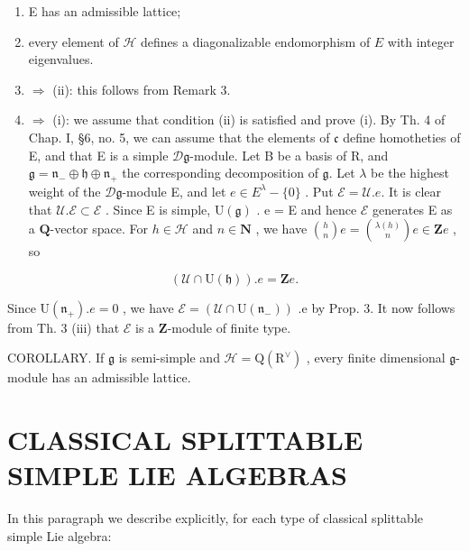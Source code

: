 \begin{enumerate}
\def\labelenumi{(\roman{enumi})}
\item
  E has an admissible lattice;
\item
  every element of \(\mathcal{H}\) defines a diagonalizable endomorphism of \(E\) with integer eigenvalues.
\item
  \(\Longrightarrow\) (ii): this follows from Remark 3.
\item
  \(\Longrightarrow\) (i): we assume that condition (ii) is satisfied and prove (i). By Th. 4 of Chap. I, §6, no. 5, we can assume that the elements of \(\mathfrak{c}\) define homotheties of E, and that E is a simple \(\mathcal{D}\mathfrak{g}\)-module. Let B be a basis of \(\mathrm{R}\), and \(\mathfrak{g} = \mathfrak{n}_{-} \oplus \mathfrak{h} \oplus \mathfrak{n}_{+}\) the corresponding decomposition of \(\mathfrak{g}\). Let \(\lambda\) be the highest weight of the \(\mathcal{D}\mathfrak{g}\)-module E, and let \(e \in E^{\lambda} - \{0\}\) . Put \(\mathcal{E} = \mathcal{U}.e\). It is clear that \(\mathcal{U}.\mathcal{E} \subset \mathcal{E}\) . Since E is simple, \(\mathrm{U}(\mathfrak{g})\) . e = E and hence \(\mathcal{E}\) generates E as a \(\mathbf{Q}\)-vector space. For \(h \in \mathcal{H}\) and \(n \in \mathbf{N}\) , we have \(\binom{h}{n} e = \binom{\lambda(h)}{n} e \in \mathbf{Z} e\) , so
\end{enumerate}

\[
(\mathcal {U} \cap \mathrm{U} (\mathfrak {h})). e = \mathbf {Z}   e.
\]

Since \(\mathrm{U}(\mathfrak{n}_{+}).e=0\) , we have \(\mathcal{E}=(\mathcal{U}\cap\mathrm{U}(\mathfrak{n}_{-}))\) .e by Prop. 3. It now follows from Th. 3 (iii) that \(\mathcal{E}\) is a \(\mathbf{Z}\)-module of finite type.

COROLLARY. If \(\mathfrak{g}\) is semi-simple and \(\mathcal{H}=\mathrm{Q}(\mathrm{R}^{\vee})\) , every finite dimensional \(\mathfrak{g}\)-module has an admissible lattice.

\section{CLASSICAL SPLITTABLE SIMPLE LIE ALGEBRAS}

In this paragraph we describe explicitly, for each type of classical splittable simple Lie algebra:

